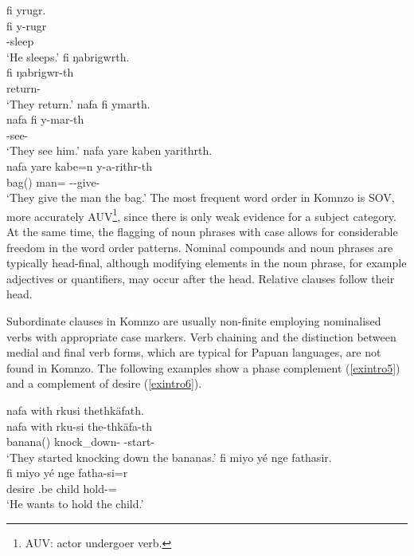 \ea \label{exintro4a}
    fi yrugr.\\
    \gll fi y-rugr\\
	 -sleep\\
	\glt `He sleeps.'
\z
\ea \label{exintro4b}
    fi ŋabrigwrth.\\
    \gll fi ŋabrigwr-th\\
	 return-\\
	\glt `They return.'
\z
\ea \label{exintro4c}
    nafa fi ymarth.\\
	\gll nafa fi y-mar-th\\
	  -see-\\
	\glt `They see him.'
\z
\ea \label{exintro4d}
    nafa yare kaben yarithrth.\\
    \gll nafa yare kabe=n y-a-rithr-th\\
	 bag() man= --give-\\
	\glt `They give the man the bag.'
\z
\newpage
The most frequent word order in Komnzo is SOV, more accurately AUV\footnote{AUV: actor undergoer verb.}, since there is only weak evidence for a subject category. At the same time, the flagging of noun phrases with case allows for considerable freedom in the word order patterns. Nominal compounds and noun phrases are typically head-final, although modifying elements in the noun phrase, for example adjectives or quantifiers, may occur after the head. Relative clauses follow their head.

Subordinate clauses in Komnzo are usually non-finite employing nominalised verbs with appropriate case markers. Verb chaining and the distinction between medial and final verb forms, which are typical for Papuan languages, are not found in Komnzo. The following examples show a phase complement (\ref{exintro5}) and a complement of desire (\ref{exintro6}).

\ea
	\label{exintro5}
	nafa with rkusi thethkäfath.\\
    \gll nafa with rku-si the-thkäfa-th\\
	 banana() knock\_down- -start-\\
	\glt `They started knocking down the bananas.'
\z
\ea
	\label{exintro6}
    fi miyo yé nge fathasir.\\
	\gll fi miyo yé nge fatha-si=r\\
	 desire .be child hold-=\\
	\glt `He wants to hold the child.'
\z


